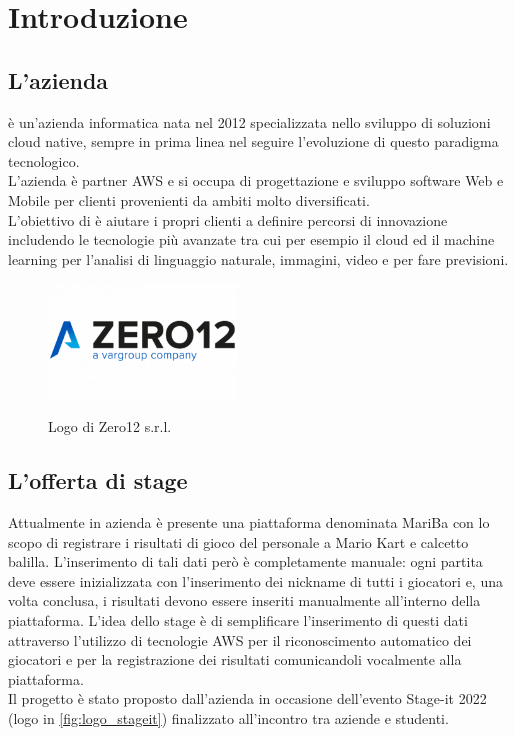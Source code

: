
\chapter{Introduzione}
\label{cap:introduzione}

\section{L'azienda}

\azienda è un'azienda informatica nata nel 2012 specializzata nello sviluppo di soluzioni cloud native, sempre in prima linea nel seguire l'evoluzione di questo paradigma tecnologico. \\
L'azienda è partner \gls{AWS} e si occupa di progettazione e sviluppo software Web e Mobile per clienti provenienti da ambiti molto diversificati. \\
L'obiettivo di \azienda è aiutare i propri clienti a definire percorsi di innovazione includendo le tecnologie più avanzate tra cui per esempio
il cloud ed il machine learning per l'analisi di linguaggio naturale, immagini, video e per fare previsioni. 

	\begin{figure}[H]
		\centering
		\includegraphics[width=5cm]{immagini/logo-zero12.png} \\
		\caption{\label{fig:logo_zero12} Logo di Zero12 s.r.l.}
	\end{figure}

\section{L'offerta di stage}
	Attualmente in azienda è presente una piattaforma denominata MariBa con lo scopo di registrare i risultati di gioco del personale a Mario Kart e calcetto balilla. L'inserimento di tali dati però è completamente manuale: ogni partita deve essere
	inizializzata con l'inserimento dei nickname di tutti i giocatori e, una volta conclusa, i risultati devono
	essere inseriti manualmente all'interno della piattaforma. L'idea dello stage è di semplificare l'inserimento di questi
	dati attraverso l'utilizzo di tecnologie \gls{AWS} per il riconoscimento automatico dei giocatori e per la registrazione dei risultati comunicandoli vocalmente alla piattaforma. \\
	Il progetto è stato proposto dall'azienda in occasione dell'evento Stage-it 2022 (logo in \autoref{fig:logo_stageit}) finalizzato all'incontro tra aziende e studenti.
	
